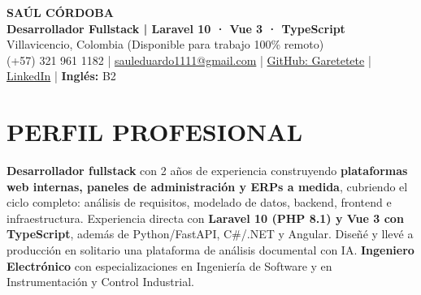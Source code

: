 \documentclass[letterpaper,10pt]{article}
\begin{document}
\begin{center}
    {\Huge \bfseries SAÚL CÓRDOBA} \\[3pt]
    {\Large \textbf{Desarrollador Fullstack | Laravel 10 · Vue 3 · TypeScript}} \\[2pt]
    Villavicencio, Colombia (Disponible para trabajo 100\% remoto) \\
    (+57) 321 961 1182 | \href{mailto:sauleduardo1111@gmail.com}{sauleduardo1111@gmail.com} | \href{https://github.com/Garetetete}{GitHub: Garetetete} | \href{https://www.linkedin.com/in/saul-cordoba-a2997427b}{LinkedIn} | \textbf{Inglés:} B2
\end{center}

\section{PERFIL PROFESIONAL}
\textbf{Desarrollador fullstack} con 2 años de experiencia construyendo \textbf{plataformas web internas, paneles de administración y ERPs a medida}, cubriendo el ciclo completo: análisis de requisitos, modelado de datos, backend, frontend e infraestructura. Experiencia directa con \textbf{Laravel 10 (PHP 8.1) y Vue 3 con TypeScript}, además de Python/FastAPI, C\#/.NET y Angular. Diseñé y llevé a producción en solitario una plataforma de análisis documental con IA. \textbf{Ingeniero Electrónico} con especializaciones en Ingeniería de Software y en Instrumentación y Control Industrial.

\end{document}
